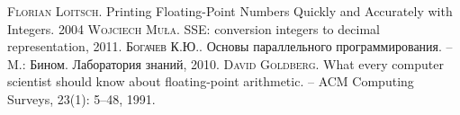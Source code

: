 \begin{thebibliography}{}

 \textsc{Florian Loitsch}.
Printing Floating-Point Numbers Quickly and Accurately with Integers. 2004
 \textsc{Wojciech Mu\l a}.
SSE: conversion integers to decimal representation, 2011.
 \textsc{Богачев К.Ю.}.
Основы параллельного программирования. -- M.: Бином. Лаборатория знаний, 2010.
 \textsc{David Goldberg.}
What every computer scientist should
know about floating-point arithmetic. -- ACM Computing Surveys, 23(1): 5–48, 1991.
\end{thebibliography}
